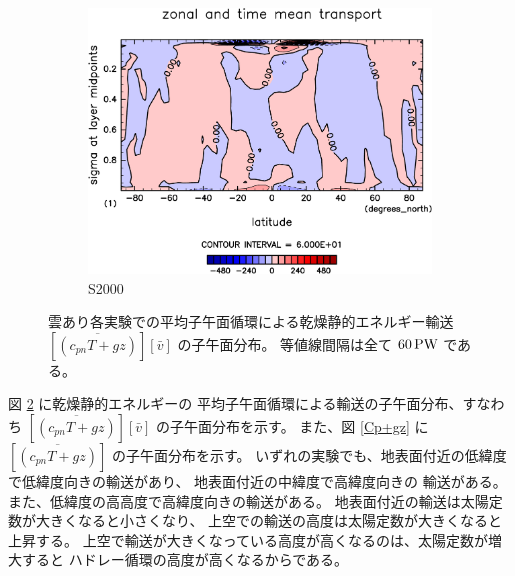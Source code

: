 \documentclass[body]{subfiles}
\begin{document}
\begin{figure}[t]
\begin{subfigure}{.4\textwidth}
		\centering
		\includegraphics[width=\textwidth]{S2000/MeriHeatTransTest@dryStatEn_M,time=7300:7665-crop-rotate.pdf}
		\caption{S2000}\label{乾燥静的エネルギー平均子午面循環S2000}
	\end{subfigure}
	\caption[雲あり各実験での平均子午面循環による乾燥静的エネルギー輸送の子午面分布]{
		雲あり各実験での平均子午面循環による乾燥静的エネルギー輸送 \([\overline{(c_{pn}T+gz)}][\bar v]\) の子午面分布。
		等値線間隔は全て \(60\hmu{PW}\) である。
	}\label{乾燥静的エネルギー平均子午面循環}
\end{figure}

図 \ref{乾燥静的エネルギー平均子午面循環} に乾燥静的エネルギーの
平均子午面循環による輸送の子午面分布、すなわち 
\([\overline{(c_{pn}T+gz)}][\bar v]\) の子午面分布を示す。
また、図 \ref{Cp+gz} に \([\overline{(c_{pn}T+gz)}]\) の子午面分布を示す。
いずれの実験でも、地表面付近の低緯度で低緯度向きの輸送があり、
地表面付近の中緯度で高緯度向きの
輸送がある。また、低緯度の高高度で高緯度向きの輸送がある。
地表面付近の輸送は太陽定数が大きくなると小さくなり、
上空での輸送の高度は太陽定数が大きくなると上昇する。
上空で輸送が大きくなっている高度が高くなるのは、太陽定数が増大すると
ハドレー循環の高度が高くなるからである。
\end{document}
